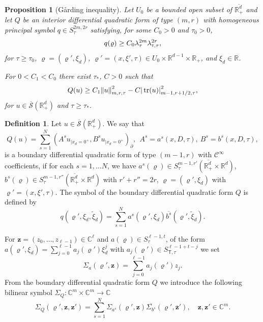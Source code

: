 \documentclass[JEP,XML,SOM,Unicode,published]{cedram}
\theoremstyle{plain}
\newtheorem{proposition}[theorem]{Proposition}
\theoremstyle{definition}
\newtheorem{definition}[theorem]{Definition}
\def\R{\mathbb{R}}
\def\C{\mathbb{C}}
\let\Bquad Q
\let\bquad q
\let\y\varrho
\let \Re \relax
\DeclareMathOperator{\Re}{Re}
\newcommand{\ovl}[1]{\overline{#1}}
\newcommand{\inp}[2]{(#1, #2)}
\newcommand{\un}[1]{\Sigma_{#1}}
\newcommand{\z}{\boldsymbol{z}}
\newcommand{\br}{\ensuremath{_{|x_d=0^+}}}
\newcommand{\Normsc}[2]{{\| #1 \|}_{#2, \tau}}
\newcommand{\normsc}[2]{{| #1 |}_{#2, \tau}}
\newcommand{\lsc}{\lambda_\tau}
\newcommand{\lsct}{\lambda_{{\scriptscriptstyle{\mathsf T}},\tau}}
\newcommand{\Ssc}{S_\tau}
\newcommand{\Ssct}{S_{{\scriptscriptstyle{\mathsf T}},\tau}}
\newcommand{\Con}{\ensuremath{\mathscr C}}
\newcommand{\Cinf}{\ensuremath{\Con^\infty}}
\newcommand{\Sbarp}{\ensuremath{\overline{\mathscr{S}}(\Rdp)}}
\newcommand{\Rdp}{\R^d_+}
\DeclareMathOperator{\trace}{tr}
\begin{document}
\begin{proposition}[G{\aa}rding inequality]
\label{prop: Gaarding quadratic forms local}
Let $U_0$ be a bounded open subset
of $\ovl{\Rdp}$ and let $Q$ be an interior differential quadratic
form of type $(m,r)$ with homogeneous
principal symbol $q\in \Ssc^{2m,2 r}$ satisfying, for some $C_0>0$
and $\tau_0>0$,
\begin{equation*}
\Re q(\y)\geq C_0 \lsc^{2m} \lsct^{2r},
\end{equation*}
for $\tau \geq \tau_0$, $\y = (\y',\xi_d)$,
$\y'=(x,\xi',\tau)\in U_0 \times \R^{d-1} \times \R_+$, and $\xi_d\in\R$.

For $0< C_1 < C_0$ there exist $\tau_\ast$, $C>0$ such that
\begin{equation*}
\Re Q(u)
\geq
C_1\Normsc{ u}{m,r}^2
-C\normsc{\trace(u)}{m-1,r+1/2}^2,
\end{equation*}
for $u\in \Sbarp$ and $\tau\geq \tau_\ast$.
\end{proposition}

\label{sec: Boundary differential quadratic forms}

\begin{definition}
\label{def: boundary quadratic form}
Let $u\in \Sbarp$. We say that
\begin{equation*}
\Bquad(u)=\sum_{s=1}^N\inp{A^s u\br}{B^s u\br}_\partial,
\ \ A^s = a^s(x,D,\tau), \ B^s = b^s(x,D,\tau),
\end{equation*}
is a boundary differential quadratic form of type $(m-1,r)$ with $\Cinf$
coefficients, if for each $s=1,\dots N$, we have $a^s(\y)\in
\Ssc^{m-1,r'}(\ovl{\Rdp} \times\R^d)$, $b^s(\y)\in
\Ssc^{m-1,r''}(\ovl{\Rdp} \times\R^d)$ with $r'+r''=2
r$, $\y=(\y',\xi_d)$ with $\y'=(x,\xi',\tau)$. The symbol of the
boundary differential quadratic form $\Bquad$ is defined by
\begin{equation*}
\bquad(\y',\xi_d,\tilde{\xi}_d)=\sum_{s=1}^N
a^{s}(\y',\xi_d)\ovl{b^s}(\y',\tilde{\xi}_d).
\end{equation*}
\end{definition}

For $\z=(z_0,\dots,z_{\ell-1})\in\C^\ell$ and $a(\y)\in
\Ssc^{\ell-1,t}$, of the form
$a(\y',\xi_d) = \sum_{j=0}^{\ell-1} a_j(\y') \xi_d^j$ with $a_j(\y') \in \Ssct^{\ell-1+t-j}$
we set
\begin{equation}
\label{eq: symbol z}
\un{a}(\y',\z)=\sum_{j=0}^{\ell-1}a_j(\y')z_j.
\end{equation}
From the boundary differential quadratic form $\Bquad$ we introduce the following
bilinear symbol $\un{\Bquad}:\C^m\times\C^m\to \C $
\begin{equation}
\label{eq: bilinear symbol-boundary quadratic form}
\un{\Bquad}(\y',\z,\z')
=\sum_{s=1}^N \un{a^s}(\y',\z)\ovl{\un{b^s}}(\y',\ovl{\z}'),
\quad \z,\z'\in\C^m.
\end{equation}
\end{document}
